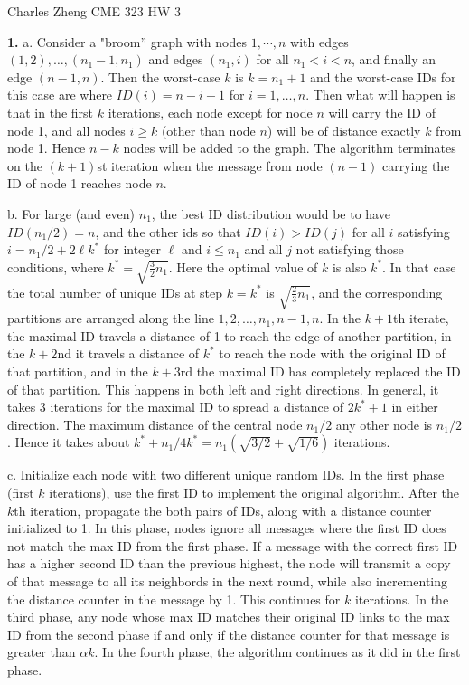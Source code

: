 \documentclass[11pt]{article}
\begin{document}
\newcommand{\tr}{\text{tr}}
\newcommand{\E}{\textbf{E}}
\newcommand{\diag}{\text{diag}}
\newcommand{\argmax}{\text{argmax}}
\newcommand{\Cov}{\text{Cov}}
\newcommand{\Var}{\text{Var}}
\newcommand{\sign}{\text{sign}}
\renewcommand{\thefootnote}{\fnsymbol{footnote}}

\begin{center}
\noindent Charles Zheng CME 323 HW 3
\end{center}

\noindent\textbf{1.}  a.  Consider a "broom'' graph with nodes
$1,\cdots, n$ with edges $(1, 2), \hdots, (n_1 - 1, n_1)$ and edges
$(n_1, i)$ for all $n_1 < i < n$, and finally an edge $(n-1, n)$.
Then the worst-case $k$ is $k = n_1 + 1$ and the worst-case IDs for
this case are where $ID(i) = n - i + 1$ for $i = 1,\hdots, n$.  Then
what will happen is that in the first $k$ iterations, each node except
for node $n$ will carry the ID of node 1, and all nodes $i \geq k$ (other
than node $n$) will be of distance exactly $k$ from node 1.  Hence $n-
k$ nodes will be added to the graph.  The algorithm terminates on the
$(k+1)$st iteration when the message from node $(n-1)$ carrying the ID
of node 1 reaches node $n$.

b.  For large (and even) $n_1$, the best ID distribution would be to have
$ID(n_1/2) = n$, and the other ids so that $ID(i) > ID(j)$ for all $i$
satisfying $i = n_1/2 + 2\ell k^*$ for integer $\ell$ and $i
\leq n_1$ and all $j$ not satisfying those conditions, where $k^* =
\sqrt{\frac{3}{2}n_1}$.  Here the optimal value of $k$ is also
$k^*$. In that case the total number of unique IDs at step $k = k^*$
is $\sqrt{\frac{2}{3} n_1}$, and the corresponding partitions are
arranged along the line $1, 2, \hdots, n_1, n-1, n$.  In the $k+1$th
iterate, the maximal ID travels a distance of 1 to reach the edge of
another partition, in the $k+2$nd it travels a distance of $k^*$ to
reach the node with the original ID of that partition, and in the
$k+3$rd the maximal ID has completely replaced the ID of that
partition.  This happens in both left and right directions.  In
general, it takes 3 iterations for the maximal ID to spread a distance
of $2k^* + 1$ in either direction.  The maximum distance of the
central node $n_1/2$ any other node is $n_1/2$.  Hence it
takes about $k^* + n_1/4k^* = n_1 (\sqrt{3/2} + \sqrt{1/6})$
iterations.

c.  Initialize each node with two different unique random IDs.  In the
first phase (first $k$ iterations), use the first ID to implement the
original algorithm. After the $k$th iteration, propagate the both
pairs of IDs, along with a distance counter initialized to 1.  In this
phase, nodes ignore all messages where the first ID does not match the
max ID from the first phase.  If a message with the correct first ID
has a higher second ID than the previous highest, the node will
transmit a copy of that message to all its neighbords in the next
round, while also incrementing the distance counter in the message by
1.  This continues for $k$ iterations. In the third phase, any node
whose max ID matches their original ID links to the max ID from the
second phase if and only if the distance counter for that message is
greater than $\alpha k$.  In the fourth phase, the algorithm continues
as it did in the first phase.
\end{document}

